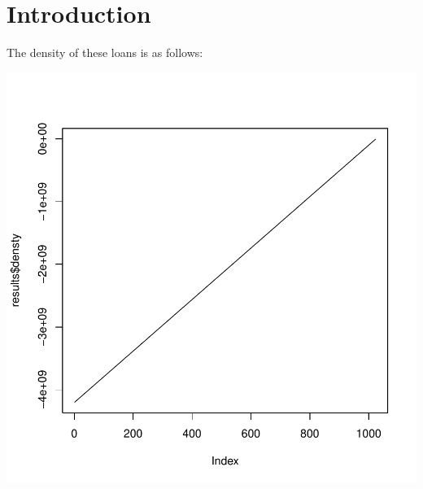 \documentclass{article}
\begin{document}

\section{Introduction}

The density of these loans is as follows:


\includegraphics{credtDemo-002}
\end{document}

